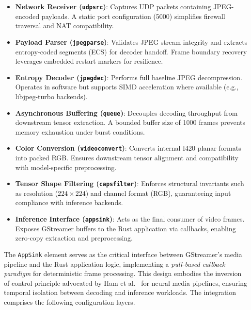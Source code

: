 \begin{itemize}
    \item \textbf{Network Receiver (\texttt{udpsrc})}: Captures UDP packets containing JPEG-encoded payloads. A static port configuration (5000) simplifies firewall traversal and NAT compatibility.

    \item \textbf{Payload Parser (\texttt{jpegparse})}: Validates JPEG stream integrity and extracts entropy-coded segments (ECS) for decoder handoff. Frame boundary recovery leverages embedded restart markers for resilience.

    \item \textbf{Entropy Decoder (\texttt{jpegdec})}: Performs full baseline JPEG decompression. Operates in software but supports SIMD acceleration where available (e.g., libjpeg-turbo backends).

    \item \textbf{Asynchronous Buffering (\texttt{queue})}: Decouples decoding throughput from downstream tensor extraction. A bounded buffer size of 1000 frames prevents memory exhaustion under burst conditions.

    \item \textbf{Color Conversion (\texttt{videoconvert})}: Converts internal I420 planar formats into packed RGB. Ensures downstream tensor alignment and compatibility with model-specific preprocessing.

    \item \textbf{Tensor Shape Filtering (\texttt{capsfilter})}: Enforces structural invariants such as resolution ($224\times224$) and channel format (RGB), guaranteeing input compliance with inference backends.

    \item \textbf{Inference Interface (\texttt{appsink})}: Acts as the final consumer of video frames. Exposes GStreamer buffers to the Rust application via callbacks, enabling zero-copy extraction and preprocessing.
\end{itemize}

The \texttt{AppSink} element serves as the critical interface between GStreamer's media pipeline and the Rust application logic, implementing a \textit{pull-based callback paradigm} for deterministic frame processing. This design embodies the inversion of control principle advocated by Ham et al.~\cite{ham2019nnstreamer} for neural media pipelines, ensuring temporal isolation between decoding and inference workloads. The integration comprises the following configuration layers.

